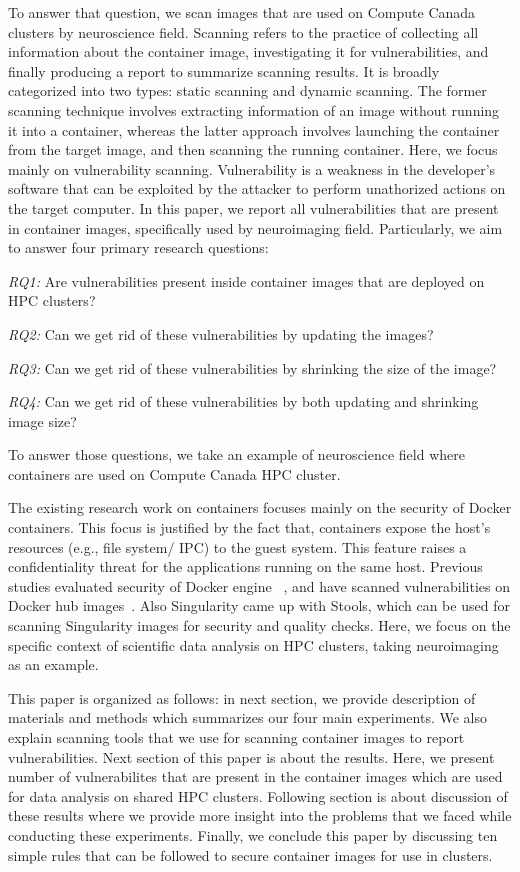 \documentclass[a4paper,num-refs]{oup-contemporary}
\begin{document}
To answer that question, we scan images that are used on Compute
Canada clusters by neuroscience field. Scanning refers to the practice of
collecting all information about the container image, investigating it
for vulnerabilities, and finally producing a
report to summarize scanning results. It is broadly categorized into
two types: static scanning and dynamic scanning. The former scanning technique
involves extracting information of an image without running it into a container,
whereas the latter approach involves launching the container from the target image, and
then scanning the running container.
Here, we focus mainly on vulnerability scanning.
Vulnerability is a weakness in the developer's software that can be exploited
by the attacker to perform unathorized actions on the target computer.
In this paper, we report all vulnerabilities that are present in
container images, specifically used by neuroimaging field. Particularly,
we aim to answer four primary research questions:

\textit{RQ1:} Are vulnerabilities present inside container images that are
deployed on HPC clusters?

\textit{RQ2:} Can we get rid of these vulnerabilities by updating the
images?

\textit{RQ3:} Can we get rid of these vulnerabilities by shrinking the
size of the image?

\textit{RQ4:} Can we get rid of these vulnerabilities by both updating
and shrinking image size?

To answer those questions, we take an example of neuroscience field where
containers are used on Compute Canada HPC cluster.

The existing research work on containers focuses mainly on the security of Docker
containers.
This focus is justified by the fact that, containers expose the host's resources
(e.g., file system/ IPC) to the guest system. This feature raises a confidentiality
threat for the applications running on the same host. Previous studies evaluated
security of Docker engine ~\cite{martin2018docker, sultan2019container, combe2016docker, bui2015analysis},
and have scanned vulnerabilities on Docker hub images~\cite{Shu2017, gummaraju2015over}.
Also Singularity came up with Stools, which can be used for scanning Singularity images
for security and quality checks.
Here, we focus on the specific context of scientific data analysis on HPC clusters, taking
neuroimaging as an example.


This paper is organized as follows: in next section, we provide description
of materials and methods which summarizes our four main experiments. We also explain
scanning tools that we use for scanning container images to report
vulnerabilities. Next section of this paper is about the results. Here, we
present number of vulnerabilites that are present in the container images
which are used for data analysis on shared HPC clusters. Following section is about 
discussion of these results where we provide more insight into the problems that 
we faced while conducting these experiments. Finally, we conclude this paper by discussing ten simple
rules that can be followed to secure container images for use in clusters.
\end{document}
